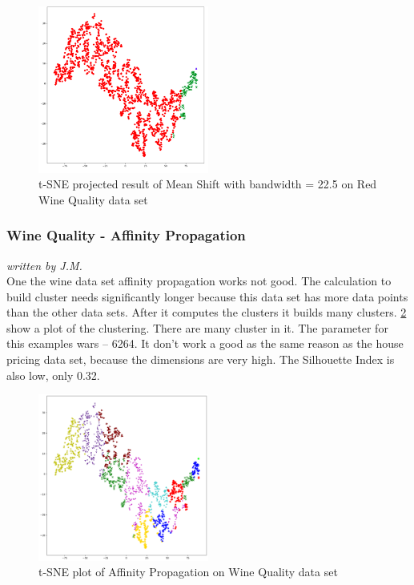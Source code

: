 \begin{figure}[H]
\begin{center}
\includegraphics[width=0.5\textwidth]{images/Meanshift_Wine_22_5.png}
\end{center}
\caption{t-SNE projected result of Mean Shift with bandwidth = 22.5 on Red Wine Quality data set}
\label{fig:meanshift_wine_22_5}
\end{figure}

\subsubsection{Wine Quality - Affinity Propagation}
\textit{written by J.M.}\\

One the wine data set affinity propagation works not good. The calculation to build cluster needs significantly longer because this data set has more data points than the other data sets. After it computes the clusters it builds many clusters.  \ref{fig:af_wine1} show a plot of the clustering. There are many cluster in it. The parameter for this examples wars – 6264. It don’t work a good as the same reason as the house pricing data set, because the dimensions are very high. The Silhouette Index is also low, only 0.32. 

\begin{figure}[H]
	\begin{center}
		\includegraphics[width=0.5\textwidth]{images/af_wine6533.png}
	\end{center}
	\caption{t-SNE plot of Affinity Propagation on Wine Quality data set}
	\label{fig:af_wine1}
\end{figure}
